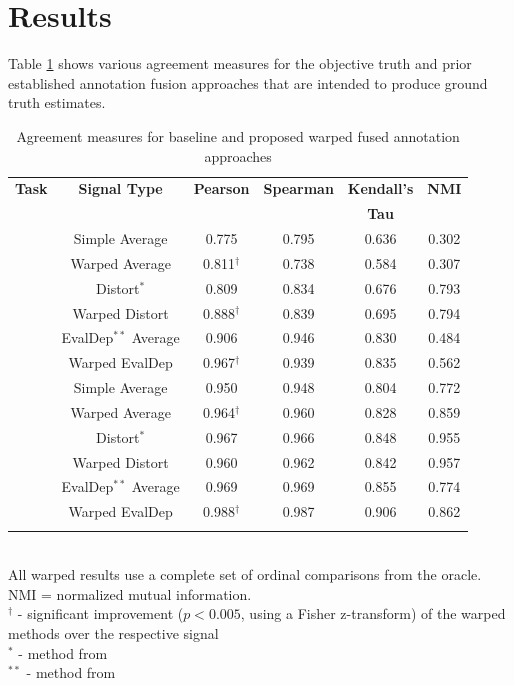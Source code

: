 \documentclass[10pt,letterpaper]{article}
\begin{document}
\section*{Results}
Table \ref{tab:results} shows various agreement measures for the objective truth and prior established annotation fusion approaches that are intended to produce ground truth estimates.

\setlength\tabcolsep{1pt}
\setlength\extrarowheight{1pt}
\begin{table}[ht!]
\caption{\label{tab:results} Agreement measures for baseline and proposed warped fused annotation approaches}
\centering
\begin{tabular}{ cccccc } 
 \Xhline{2\arrayrulewidth}
 \textbf{Task} & \textbf{Signal Type} & \textbf{Pearson} & \textbf{Spearman} & \textbf{Kendall's} & \textbf{NMI} \\
  & & & & \textbf{Tau} & \\
 \Xhline{2\arrayrulewidth}
 \multirow{6}{*}{\textbf{A}} & Simple Average & 0.775 & 0.795 & 0.636 & 0.302 \\ 
 & Warped Average & 0.811$^\dagger$ & 0.738 & 0.584 & 0.307 \\
 \cline{2-6}
 & Distort$^{*}$ & 0.809 & 0.834 & 0.676 & 0.793 \\
 & Warped Distort & 0.888$^\dagger$ & 0.839 & 0.695 & 0.794 \\
 \cline{2-6}
 & EvalDep$^{**}$ Average & 0.906 & 0.946 & 0.830 & 0.484 \\
 & Warped EvalDep & 0.967$^\dagger$ & 0.939 & 0.835 & 0.562 \\
 \Xhline{2\arrayrulewidth}
 \multirow{6}{*}{\textbf{B}} & Simple Average & 0.950 & 0.948 & 0.804 & 0.772 \\ 
 & Warped Average & 0.964$^\dagger$ & 0.960 & 0.828 & 0.859 \\
 \cline{2-6}
 & Distort$^{*}$  & 0.967 & 0.966 & 0.848 & 0.955 \\
 & Warped Distort  & 0.960 & 0.962 & 0.842 & 0.957 \\
 \cline{2-6}
 & EvalDep$^{**}$ Average  & 0.969 & 0.969 & 0.855 & 0.774 \\
 & Warped EvalDep  & 0.988$^\dagger$ & 0.987 & 0.906 & 0.862 \\
 \Xhline{2\arrayrulewidth}
\end{tabular}
\vspace*{4pt} \\
{\footnotesize All warped results use a complete set of ordinal comparisons from the oracle. NMI = normalized mutual information.  \\ $^\dagger$ - significant improvement ($p<0.005$, using a Fisher z-transform) of the warped methods over the respective signal \\ $^{*}$ - method from \cite{Gupta2016} \\ $^{**}$ - method from \cite{Mariooryad2015}}
\end{table}
\end{document}
